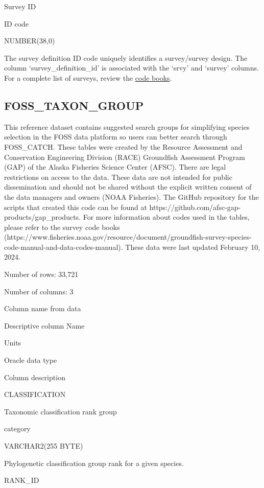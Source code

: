 \documentclass[
  letterpaper,
  oneside,
  open=any]{scrbook}
\begin{document}
Survey ID

ID code

NUMBER(38,0)

The survey definition ID code uniquely identifies a survey/survey
design. The column `survey\_definition\_id' is associated with the
`srvy' and `survey' columns. For a complete list of surveys, review the
\href{https://www.fisheries.noaa.gov/resource/document/groundfish-survey-species-code-manual-and-data-codes-manual}{code
books}.

\hypertarget{foss_taxon_group}{%
\subsection{FOSS\_TAXON\_GROUP}\label{foss_taxon_group}}

This reference dataset contains suggested search groups for simplifying
species selection in the FOSS data platform so users can better search
through FOSS\_CATCH. These tables were created by the Resource
Assessment and Conservation Engineering Division (RACE) Groundfish
Assessment Program (GAP) of the Alaska Fisheries Science Center (AFSC).
There are legal restrictions on access to the data. These data are not
intended for public dissemination and should not be shared without the
explicit written consent of the data managers and owners (NOAA
Fisheries). The GitHub repository for the scripts that created this code
can be found at https://github.com/afsc-gap-products/gap\_products. For
more information about codes used in the tables, please refer to the
survey code books
(https://www.fisheries.noaa.gov/resource/document/groundfish-survey-species-code-manual-and-data-codes-manual).
These data were last updated February 10, 2024.

Number of rows: 33,721

Number of columns: 3

Column name from data

Descriptive column Name

Units

Oracle data type

Column description

CLASSIFICATION

Taxonomic classification rank group

category

VARCHAR2(255 BYTE)

Phylogenetic classification group rank for a given species.

RANK\_ID
\end{document}
